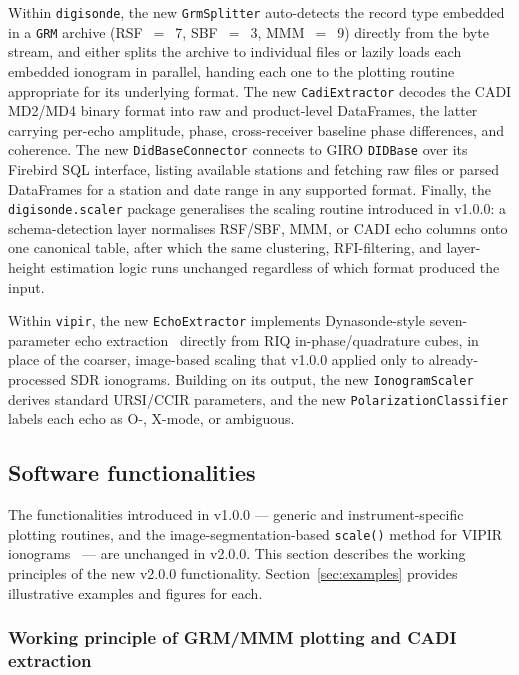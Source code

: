 \documentclass[12pt,a4paper]{article}
\begin{document}
Within \texttt{digisonde}, the new \texttt{GrmSplitter} auto-detects the
record type embedded in a \texttt{GRM} archive (RSF~$=$~7, SBF~$=$~3,
MMM~$=$~9) directly from the byte stream, and either splits the archive to
individual files or lazily loads each embedded ionogram in parallel, handing
each one to the plotting routine appropriate for its underlying format. The
new \texttt{CadiExtractor} decodes the CADI MD2/MD4 binary format into raw
and product-level DataFrames, the latter carrying per-echo amplitude, phase,
cross-receiver baseline phase differences, and coherence. The new
\texttt{DidBaseConnector} connects to GIRO \texttt{DIDBase} over its Firebird
SQL interface, listing available stations and fetching raw files or parsed
DataFrames for a station and date range in any supported format. Finally, the
\texttt{digisonde.scaler} package generalises the scaling routine introduced
in v1.0.0: a schema-detection layer normalises RSF/SBF, MMM, or CADI echo
columns onto one canonical table, after which the same clustering,
RFI-filtering, and layer-height estimation logic runs unchanged regardless of
which format produced the input.

Within \texttt{vipir}, the new \texttt{EchoExtractor} implements
Dynasonde-style seven-parameter echo extraction~\cite{Zabotin2005} directly
from RIQ in-phase/quadrature cubes, in place of the coarser, image-based
scaling that v1.0.0 applied only to already-processed SDR ionograms. Building
on its output, the new \texttt{IonogramScaler} derives standard URSI/CCIR
parameters, and the new \texttt{PolarizationClassifier} labels each echo as
O-, X-mode, or ambiguous.

\subsection{Software functionalities}
\label{ssec:functionalities}

The functionalities introduced in v1.0.0 --- generic and instrument-specific
plotting routines, and the image-segmentation-based \texttt{scale()} method
for VIPIR ionograms~\cite{Chakraborty2026} --- are unchanged in v2.0.0. This
section describes the working principles of the new v2.0.0 functionality.
Section~\ref{sec:examples} provides illustrative examples and figures for
each.

\subsubsection{Working principle of GRM/MMM plotting and CADI extraction}
\end{document}
